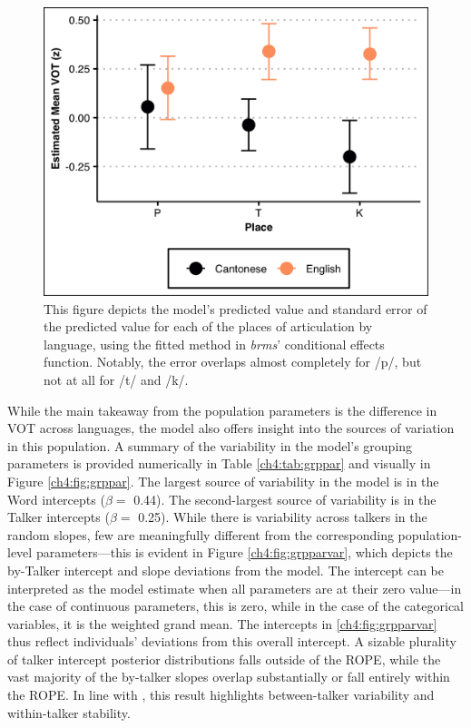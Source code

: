 \begin{figure}[htbp]
  \begin{center}
  \includegraphics[width=0.8\linewidth]{figures/ch4_conditionaleffects_4in.png} 
  \caption{This figure depicts the model's predicted value and standard error of the predicted value for each of the places of articulation by language, using the fitted method in \textit{brms}' conditional effects function. Notably, the error overlaps almost completely for /p/, but not at all for /t/ and /k/.}
  \label{ch4:fig:conditionaleffects}
  \end{center}
\end{figure}

While the main takeaway from the population parameters is the difference in VOT across languages, the model also offers insight into the sources of variation in this population. A summary of the variability in the model's grouping parameters is provided numerically in Table \ref{ch4:tab:grppar} and visually in Figure \ref{ch4:fig:grppar}. The largest source of variability in the model is in the Word intercepts ($\beta=$ 0.44). The second-largest source of variability is in the Talker intercepts ($\beta=$ 0.25). While there is variability across talkers in the random slopes, few are meaningfully different from the corresponding population-level parameters---this is evident in Figure \ref{ch4:fig:grpparvar}, which depicts the by-Talker intercept and slope deviations from the model. The intercept can be interpreted as the model estimate when all parameters are at their zero value---in the case of continuous parameters, this is zero, while in the case of the categorical variables, it is the weighted grand mean. The intercepts in \ref{ch4:fig:grpparvar} thus reflect individuals' deviations from this overall intercept. A sizable plurality of talker intercept posterior distributions falls outside of the ROPE, while the vast majority of the by-talker slopes overlap substantially or fall entirely within the ROPE. In line with \citet{chodroff_2017_structure}, this result highlights between-talker variability and within-talker stability. 

